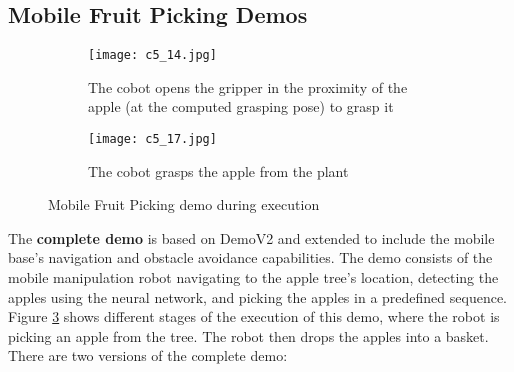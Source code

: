 \subsection{Mobile Fruit Picking Demos}

\begin{figure}[t]
    \centering
    \begin{subfigure}{\textwidth}
        \texttt{[image: c5\_14.jpg]} %
        \caption{The cobot opens the gripper in the proximity of the apple (at the computed grasping pose) to grasp it}
        \label{fig:mfp1}
    \end{subfigure}
    
    \vspace{1em} %

    \begin{subfigure}{\textwidth}
        \texttt{[image: c5\_17.jpg]} %
        \caption{The cobot grasps the apple from the plant}
        \label{fig:mfp2}
    \end{subfigure}

    \caption{Mobile Fruit Picking demo during execution}
    \label{fig:mfp_}
\end{figure}

The \textbf{complete demo} is based on DemoV2 and extended to include the mobile base's navigation and obstacle avoidance
capabilities. The demo consists of the mobile manipulation robot navigating to the apple tree's location, detecting the apples
using the neural network, and picking the apples in a predefined sequence.
Figure \ref{fig:mfp_} shows different stages of the execution of this demo, where the robot is picking an apple from the tree.
The robot then drops the apples into a basket. There are two versions of the complete demo:

